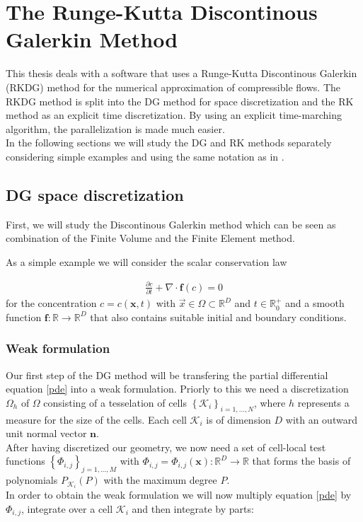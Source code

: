 \chapter{The Runge-Kutta Discontinous Galerkin Method}
	This thesis deals with a software that uses a Runge-Kutta Discontinous Galerkin (RKDG) method for the numerical approximation of compressible flows. The RKDG method is split into the DG method for space discretization and the RK method as an explicit time discretization. By using an explicit time-marching algorithm, the parallelization is made much easier. \\ \indent
	In the following sections we will study the DG and RK methods separately considering simple examples and using the same notation as in \cite{mueller2014}.
	\section{DG space discretization}
		First, we will study the Discontinous Galerkin method which can be seen as combination of the Finite Volume and the Finite Element method.

		As a simple example we will consider the scalar conservation law 
		
		\begin{align}
			\frac{\partial c}{\partial t} + \nabla \cdot \boldsymbol{f}(c) = 0
			\label{pde}
		\end{align}	
		for the concentration $c = c(\boldsymbol{x}, t)$  with $\vec{x} \in \Omega \subset \mathbb{R}^D$ and $t\in \mathbb{R}_0^+$ and a smooth function $\boldsymbol{f}:\mathbb{R} \rightarrow \mathbb{R}^D$ that also contains suitable initial and boundary conditions.\cite{mueller2014} 
		\subsection{Weak formulation}
		Our first step of the DG method will be transfering the partial differential equation \eqref{pde} into a weak formulation.
		Priorly to this we need a discretization $\Omega_h$ of $\Omega$ consisting of a tesselation of cells $\left\{ \mathcal{K}_i \right\}_{i=1,...,N}$, where $h$ represents a measure for the size of the cells. Each cell $\mathcal{K}_i$ is of dimension $D$ with an outward unit normal vector $\boldsymbol{n}$. \\ \indent 
		After having discretized our geometry, we now need a set of cell-local test functions $\left\{\Phi_{i,j}\right\}_{j=1,...,M} $ with $\Phi_{i,j}=\Phi_{i,j}(\boldsymbol{x}):\mathbb{R}^D\rightarrow\mathbb{R}$ that forms the basis of polynomials $P_{\mathcal{K}_i}(P)$ with the maximum degree $P$. \\ \indent
		In order to obtain the weak formulation we will now multiply equation \eqref{pde} by $\Phi_{i,j}$, integrate over a cell $\mathcal{K}_i$ and then integrate by parts:
		
